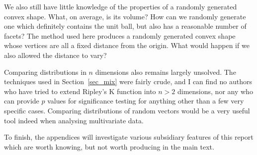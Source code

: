 We also still have little knowledge of the properties of a randomly generated convex shape. What, on average, is its volume? How can we randomly generate one which definitely contains the unit ball, but also has a reasonable number of facets? The method used here produces a randomly generated convex shape whose vertices are all a fixed distance from the origin. What would happen if we also allowed the distance to vary?

Comparing distributions in $n$ dimensions also remains largely unsolved. The techniques used in Section~\ref{sec_mix} were fairly crude, and I can find no authors who have tried to extend Ripley's K function into $n>2$ dimensions, nor any who can provide $p$ values for significance testing for anything other than a few very specific cases. Comparing distributions of random vectors would be a very useful tool indeed when analysing multivariate data.

To finish, the appendices will investigate various subsidiary features of this report which are worth knowing, but not worth producing in the main text.